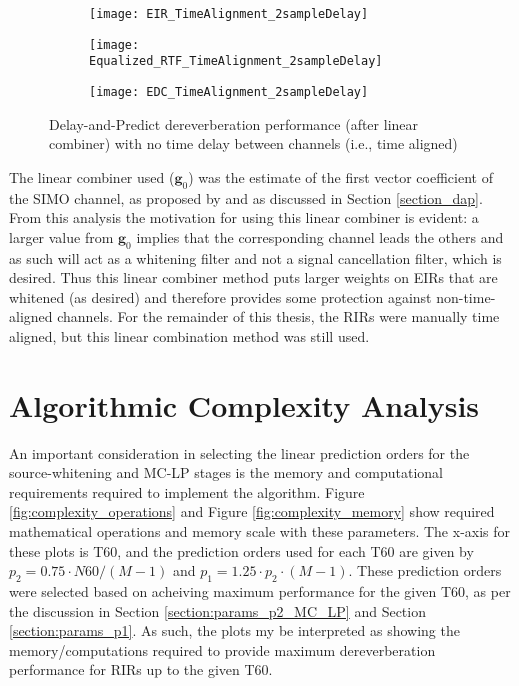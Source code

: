 \begin{figure}[H]
	\centering
	\begin{subfigure}[b]{0.32\textwidth}
		\centering
		\texttt{[image: EIR\_TimeAlignment\_2sampleDelay]}
	\end{subfigure}
	\hfill
	\begin{subfigure}[b]{0.32\textwidth}
		\centering
		\texttt{[image: Equalized\_RTF\_TimeAlignment\_2sampleDelay]}
	\end{subfigure}
	\hfill
	\begin{subfigure}[b]{0.32\textwidth}
		\centering
		\texttt{[image: EDC\_TimeAlignment\_2sampleDelay]}
	\end{subfigure}
	\hfill
	\caption{Delay-and-Predict dereverberation performance (after linear combiner) with no time delay between channels (i.e., time aligned)}
	\label{fig:params_TimeAlignment_2sampleDelay}
\end{figure}

The linear combiner used ($\boldsymbol{g}_0$) was the estimate of the first vector coefficient of the SIMO channel, as proposed by \cite{triki2006delay} and as discussed in Section \ref{section_dap}. From this analysis the motivation for using this linear combiner is evident: a larger value from $\boldsymbol{g}_0$ implies that the corresponding channel leads the others and as such will act as a whitening filter and not a signal cancellation filter, which is desired. Thus this linear combiner method puts larger weights on EIRs that are whitened (as desired) and therefore provides some protection against non-time-aligned channels. For the remainder of this thesis, the RIRs were manually time aligned, but this linear combination method was still used.

\section{Algorithmic Complexity Analysis}

An important consideration in selecting the linear prediction orders for the source-whitening and MC-LP stages is the memory and computational requirements required to implement the algorithm. Figure \ref{fig:complexity_operations} and Figure \ref{fig:complexity_memory} show required mathematical operations and memory scale with these parameters. The x-axis for these plots is T60, and the prediction orders used for each T60 are given by $p_2 = 0.75 \cdot N60 / \left(M-1\right)$ and $p_1 = 1.25 \cdot p_2 \cdot \left(M-1\right)$. These prediction orders were selected based on acheiving maximum performance for the given T60, as per the discussion in Section \ref{section:params_p2_MC_LP} and Section \ref{section:params_p1}. As such, the plots my be interpreted as showing the memory/computations required to provide maximum dereverberation performance for RIRs up to the given T60.

